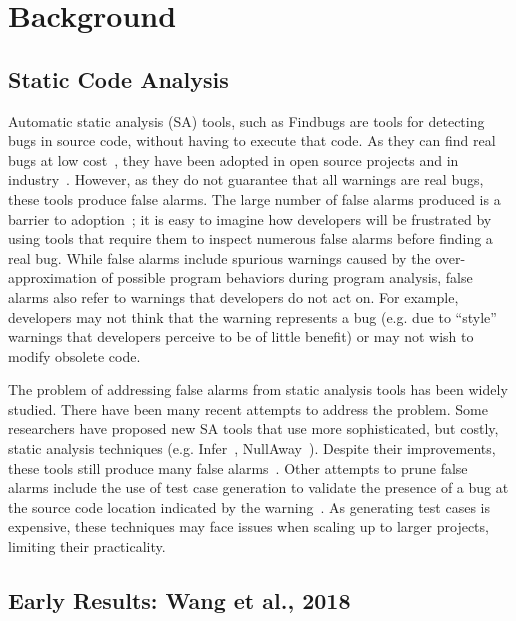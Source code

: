 \section{Background}
\label{sec:background}



 

\subsection{Static Code Analysis}
Automatic static analysis (SA) tools, such as Findbugs
are tools for   detecting bugs in source code,
without having to execute that code.
As they can find real bugs at low cost~\cite{thung2012extent,habib2018many}, they have been adopted in open source projects and in industry~\cite{ayewah2010google,sadowski2018lessons,beller2016analyzing,zampetti2017open,panichella2015would,vassallo2020developers}.
However, as they do not guarantee that all warnings are real bugs, 
these tools produce false alarms. 
The large number of false alarms produced is a barrier to adoption~\cite{johnson2013don,ChristakisB16}; it is easy to imagine how developers will be frustrated by using tools that require them to inspect numerous false alarms before finding a real bug.
While false alarms include spurious warnings caused by the over-approximation of possible program behaviors during program analysis, 
false alarms also refer to warnings that developers do not act on.
For example, developers may not think that the warning represents a bug (e.g. due to ``style'' warnings that developers perceive to be of little benefit) or may not wish to modify obsolete code. 

The problem of addressing false alarms from static analysis tools has been widely studied.
There have been many recent attempts to address the problem. 
Some researchers have proposed new SA tools that use  more sophisticated, but costly, static analysis techniques (e.g. Infer~\cite{calcagno2015moving}, NullAway~\cite{banerjee2019nullaway}).
Despite their improvements, these tools still produce many false alarms~\cite{tomassi2021real}.
Other attempts to prune false alarms include the use of test case generation to validate the presence of a bug  at the source code location indicated by the warning~\cite{kallingal2021validating}.
As generating test cases is expensive, these techniques may face issues when scaling up to larger projects, limiting their practicality.


\subsection{Early Results:  Wang et al., 2018}


